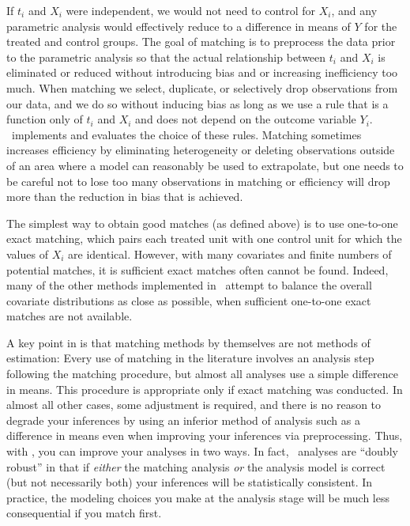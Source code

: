 If $t_i$ and $X_i$ were independent, we would not need to control for
$X_i$, and any parametric analysis would effectively reduce to a
difference in means of $Y$ for the treated and control groups.  The
goal of matching is to preprocess the data prior to the parametric
analysis so that the actual relationship between $t_i$ and $X_i$ is
eliminated or reduced without introducing bias and or increasing
inefficiency too much.  When matching we select, duplicate, or
selectively drop observations from our data, and we do so without
inducing bias as long as we use a rule that is a function only of
$t_i$ and $X_i$ and does not depend on the outcome variable $Y_i$.
\MatchIt\ implements and evaluates the choice of these rules.
Matching sometimes increases efficiency by eliminating heterogeneity
or deleting observations outside of an area where a model can
reasonably be used to extrapolate, but one needs to be careful not to
lose too many observations in matching or efficiency will drop more
than the reduction in bias that is achieved.

The simplest way to obtain good matches (as defined above) is to use
one-to-one exact matching, which pairs each treated unit with one
control unit for which the values of $X_i$ are identical.  However,
with many covariates and finite numbers of potential matches, it is
sufficient exact matches often cannot be found.  Indeed, many of the
other methods implemented in \MatchIt\ attempt to balance the overall
covariate distributions as close as possible, when sufficient
one-to-one exact matches are not available.

A key point in \citet*{HoImaKin07} is that matching methods by
themselves are not methods of estimation: Every use of matching in the
literature involves an analysis step following the matching procedure,
but almost all analyses use a simple difference in means.  This
procedure is appropriate only if exact matching was conducted.  In
almost all other cases, some adjustment is required, and there is no
reason to degrade your inferences by using an inferior method of
analysis such as a difference in means even when improving your
inferences via preprocessing.  Thus, with \MatchIt, you can improve
your analyses in two ways.  In fact, \MatchIt\ analyses are ``doubly
robust'' in that if \emph{either} the matching analysis \emph{or} the
analysis model is correct (but not necessarily both) your inferences
will be statistically consistent.  In practice, the modeling choices
you make at the analysis stage will be much less consequential if you
match first.

